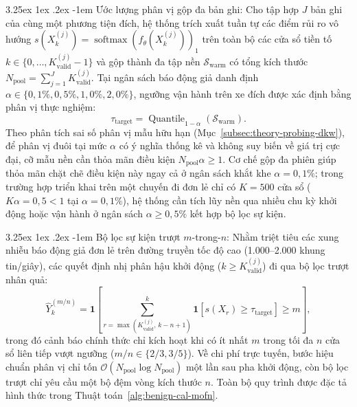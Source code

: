 \documentclass[12pt, a4paper, reqno, oneside]{book}
\makeatletter
\renewcommand\paragraph{\@startsection{paragraph}{5}{\z@}%
  {3.25ex \@plus1ex \@minus.2ex}%
  {-1em}%
  {\normalfont\normalsize\bfseries}}
\makeatother
\begin{document}
\paragraph{Ước lượng phân vị gộp đa bản ghi:} Cho tập hợp $J$ bản ghi của cùng một phương tiện đích, hệ thống trích xuất tuần tự các điểm rủi ro vô hướng $s(X_k^{(j)}) = \operatorname{softmax}(f_\theta(X_k^{(j)}))_1$ trên toàn bộ các cửa sổ tiền tố $k \in \{0, \dots, K_{\text{valid}}^{(j)} - 1\}$ và gộp thành đa tập nền $\mathcal{S}_{\text{warm}}$ có tổng kích thước $N_{\text{pool}} = \sum_{j=1}^{J} K_{\text{valid}}^{(j)}$. Tại ngân sách báo động giả danh định $\alpha \in \{0{,}1\%, 0{,}5\%, 1{,}0\%, 2{,}0\%\}$, ngưỡng vận hành trên xe đích được xác định bằng phân vị thực nghiệm:
\begin{equation}
\tau_{\text{target}} = \operatorname{Quantile}_{1-\alpha}(\mathcal{S}_{\text{warm}}).
\end{equation}
Theo phân tích sai số phân vị mẫu hữu hạn (Mục~\ref{subsec:theory-probing-dkw}), để phân vị đuôi tại mức $\alpha$ có ý nghĩa thống kê và không suy biến về giá trị cực đại, cỡ mẫu nền cần thỏa mãn điều kiện $N_{\text{pool}}\alpha \ge 1$. Cơ chế gộp đa phiên giúp thỏa mãn chặt chẽ điều kiện này ngay cả ở ngân sách khắt khe $\alpha = 0{,}1\%$; trong trường hợp triển khai trên một chuyến đi đơn lẻ chỉ có $K = 500$ cửa sổ ($K\alpha = 0{,}5 < 1$ tại $\alpha = 0{,}1\%$), hệ thống cần tích lũy nền qua nhiều chu kỳ khởi động hoặc vận hành ở ngân sách $\alpha \ge 0{,}5\%$ kết hợp bộ lọc sự kiện.

\paragraph{Bộ lọc sự kiện trượt $m$-trong-$n$:} Nhằm triệt tiêu các xung nhiễu báo động giả đơn lẻ trên đường truyền tốc độ cao (1.000--2.000 khung tin/giây), các quyết định nhị phân hậu khởi động ($k \ge K_{\text{valid}}^{(j)}$) đi qua bộ lọc trượt nhân quả:
\begin{equation}\label{eq:mofn-filter}
\hat{Y}_k^{(m/n)} = \mathbf{1}\!\left[\sum_{r = \max(K_{\text{valid}}^{(j)},\, k - n + 1)}^{k} \mathbf{1}\!\left[s(X_r) \ge \tau_{\text{target}}\right] \ge m\right],
\end{equation}
trong đó cảnh báo chính thức chỉ kích hoạt khi có ít nhất $m$ trong tối đa $n$ cửa sổ liên tiếp vượt ngưỡng ($m/n \in \{2/3, 3/5\}$). Về chi phí trực tuyến, bước hiệu chuẩn phân vị chỉ tốn $\mathcal{O}(N_{\text{pool}} \log N_{\text{pool}})$ một lần sau pha khởi động, còn bộ lọc trượt chỉ yêu cầu một bộ đệm vòng kích thước $n$. Toàn bộ quy trình được đặc tả hình thức trong Thuật toán~\ref{alg:benign-cal-mofn}.
\end{document}
